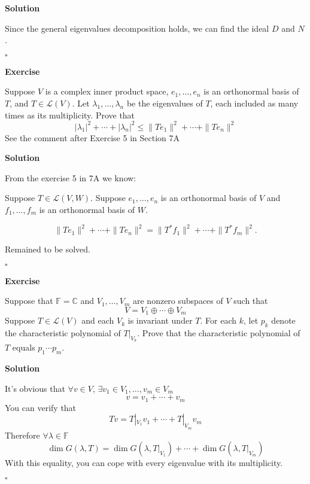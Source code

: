 \documentclass{article}
\newenvironment{exercise}{%
{\textbf{Exercise\\}
    }
}{
}
\newenvironment{solution}{%
{
    \textbf{Solution\\}
    }
}{
  \hfill $\square$ 
  \par\bigskip 
}
\newcommand{\CC}{\mathbb{C}}
\newcommand{\FF}{\mathbb{F}}
\begin{document}
\begin{CJK}{UTF8}{gkai}
\begin{solution}
    Since the general eigenvalues decomposition holds, we can find the ideal $D$ and $N$.
\end{solution}

\begin{exercise}
    Suppose $V$ is a complex inner product space, $e_1,\ldots,e_n$ is an orthonormal basis of $T$, and $T \in \mathcal{L}(V)$. Let $\lambda_1,\ldots, \lambda_n$ be the eigenvalues of $T$, each included as many times as its multiplicity. Prove that
    \[|\lambda_1|^2 + \cdots +|\lambda_n|^2 \leq \|Te_1\|^2 + \cdots+\|Te_n\|^2\]
    See the comment after Exercise 5 in Section 7A
\end{exercise}

\begin{solution}
    From the exercise 5 in 7A we know:

    Suppose $T \in \mathcal{L}(V,W)$. Suppose $e_1,\ldots,e_n$ is an orthonormal basis of $V$ and    $f_1, \ldots, f_m$ is an orthonormal basis of $W$.
    
    \[\|Te_1\|^2 + \cdots+\|Te_n\|^2 = \|T^\ast f_1\|^2 + \cdots+\|T^\ast f_m\|^2.\] 

    Remained to be solved.

    
\end{solution}

\begin{exercise}
    Suppose that $\FF = \CC$ and $V_1,\ldots,V_m$ are nonzero subspaces of $V$ such that
    \[V =V_1\oplus\cdots\oplus V_m\]
    Suppose $T \in \mathcal{L}(V)$ and each $V_k$ is invariant under $T$. For each $k$, let $p_k$ denote the characteristic polynomial of $T|_{V_k}$. Prove that the characteristic polynomial of $T$ equals $p_1\cdots p_m$.
\end{exercise}

\begin{solution}
    It's obvious that $\forall v \in V$, $\exists v_1 \in V_1,\ldots,v_m \in V_m$
    \[v = v_1 + \cdots + v_m\]
    You can verify that
    \[Tv = T|_{V_1} v_1 + \cdots + T|_{V_m} v_m\]
    Therefore $\forall \lambda \in \FF$
    \[\dim G(\lambda,T) = \dim G(\lambda,T|_{V_1}) + \cdots + \dim G(\lambda,T|_{V_m})\]
    With this equality, you can cope with every eigenvalue with its multiplicity.
\end{solution}


\end{CJK}
\end{document}

